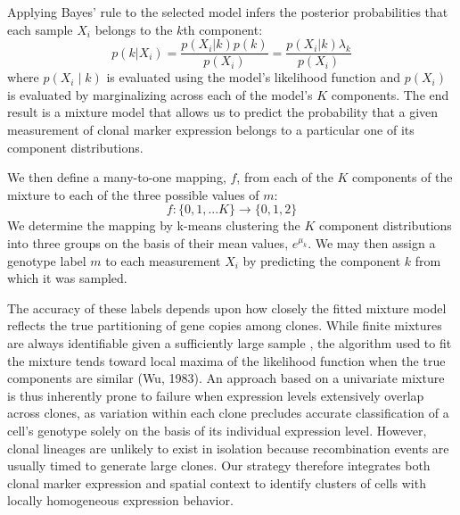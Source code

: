 Applying Bayes' rule to the selected model infers the posterior probabilities that each sample $X_i$ belongs to the $k$th component:
\begin{equation}
p(k|X_i) = \frac{p(X_i | k) p(k)}{p(X_i)} = \frac{p(X_i | k) \lambda_k}{p(X_i)}
\end{equation}
where $p(X_i \mid k)$ is evaluated using the model's likelihood function and $p(X_i)$ is evaluated by marginalizing across each of the model's $K$ components. The end result is a mixture model that allows us to predict the probability that a given measurement of clonal marker expression belongs to a particular one of its component distributions.

We then define a many-to-one mapping, $f$, from each of the $K$ components of the mixture to each of the three possible values of $m$:
\begin{equation}
f: \{0,1,...K\} \to \{0,1,2\}
\end{equation}
We determine the mapping by k-means clustering the $K$ component distributions into three groups on the basis of their mean values, $e^{\mu_k}$. We may then assign a genotype label $m$ to each measurement $X_i$ by predicting the component $k$ from which it was sampled. 

The accuracy of these labels depends upon how closely the fitted mixture model reflects the true partitioning of gene copies among clones. While finite mixtures are always identifiable given a sufficiently large sample \cite{Teicher1963}, the algorithm used to fit the mixture tends toward local maxima of the likelihood function when the true components are similar (Wu, 1983). An approach based on a univariate mixture is thus inherently prone to failure when expression levels extensively overlap across clones, as variation within each clone precludes accurate classification of a cell's genotype solely on the basis of its individual expression level. However, clonal lineages are unlikely to exist in isolation because recombination events are usually timed to generate large clones. Our strategy therefore integrates both clonal marker expression and spatial context to identify clusters of cells with locally homogeneous expression behavior.


